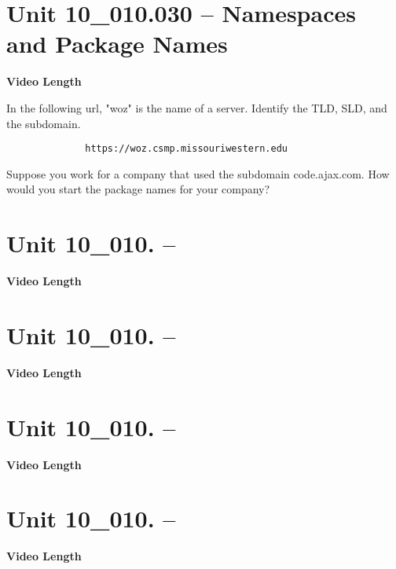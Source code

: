 \documentclass[letterpaper,12pt]{exam}
\newcommand{\unit}{Unit 10}
\begin{document}
\begin{questions}
\section*{\unit\_010.030 -- Namespaces and Package Names} 
\par{\selectfont\textbf{Video Length }}

\begin{samepage}
    \question In the following url, "woz" is the name of a server.  Identify the TLD, SLD, and the subdomain.
    \begin{verbatim}
              https://woz.csmp.missouriwestern.edu
    \end{verbatim}
    \vspace{5mm}
\end{samepage}

\begin{samepage}
    \question Suppose you work for a company that used the subdomain code.ajax.com.  How would you start the package names for your company?
    \vspace{5mm}
\end{samepage}


\section*{\unit\_010. -- } 
\par{\selectfont\textbf{Video Length }}

\section*{\unit\_010. -- } 
\par{\selectfont\textbf{Video Length }}

\section*{\unit\_010. -- } 
\par{\selectfont\textbf{Video Length }}

\section*{\unit\_010. -- } 
\par{\selectfont\textbf{Video Length }}


\end{questions}
\end{document}
